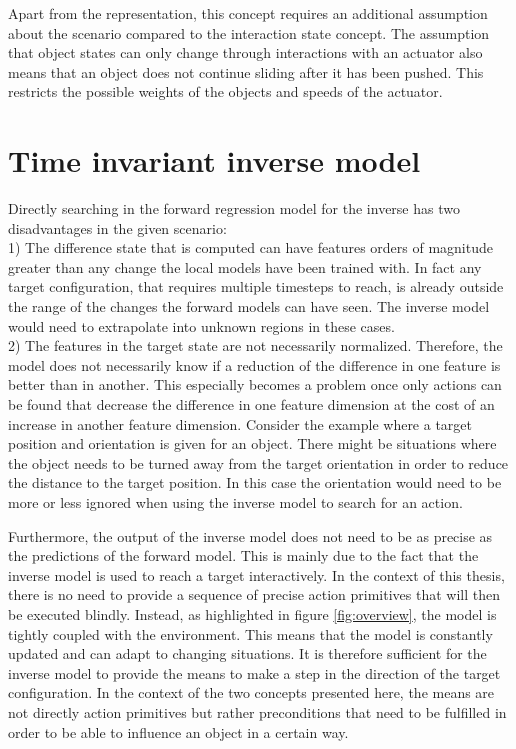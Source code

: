 Apart from the representation, this concept requires an additional assumption about the scenario compared to the interaction state concept. The assumption that object states can only change through interactions with an actuator also means that an object does not continue sliding after it has been pushed. This restricts the possible weights of the objects and speeds of the actuator.

\section{Time invariant inverse model \label{sec:invModel}}
Directly searching in the forward regression model for the inverse has two disadvantages in the given scenario: \\
1) The difference state that is computed can have features orders of magnitude greater than any change the local models have been trained with. In fact any target configuration, that requires multiple timesteps to reach, is already outside the range of the changes the forward models can have seen. 
The inverse model would need to extrapolate into unknown regions in these cases. \\
2) The features in the target state are not necessarily normalized. Therefore, the model does not necessarily know if a reduction of the difference in one feature is better than in another. This especially becomes a problem once only actions can be found that decrease the difference in one feature dimension at the cost of an increase in another feature dimension. Consider the example where a target position and orientation is given for an object. There might be situations where the object needs to be turned away from the target orientation in order to reduce the distance to the target position. In this case the orientation would need to be more or less ignored when using the inverse model to search for an action.

Furthermore, the output of the inverse model does not need to be as precise as the predictions of the forward model. This is mainly due to the fact that the inverse model is used to reach a target interactively. In the context of this thesis, there is no need to provide a sequence of precise action primitives that will then be executed blindly. Instead, as highlighted in figure \ref{fig:overview}, the model is tightly coupled with the environment. This means that the model is constantly updated and can adapt to changing situations. It is therefore sufficient for the inverse model to provide the means to make a step in the direction of the target configuration. In the context of the two concepts presented here, the means are not directly action primitives but rather preconditions that need to be fulfilled in order to be able to influence an object in a certain way.


